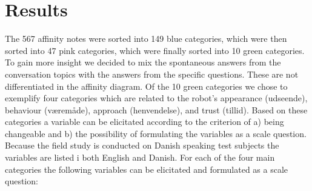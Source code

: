 \section{Results}
\label{Results}
%
The 567 affinity notes were sorted into 149 blue categories, which were then sorted into 47 pink categories, which were finally sorted into 10 green categories. To gain more insight we decided to mix the spontaneous answers from the conversation topics with the answers from the specific questions. These are not differentiated in the affinity diagram. Of the 10 green categories we chose to exemplify four categories which are related to the robot’s appearance (udseende), behaviour (væremåde), approach (henvendelse), and trust (tillid). Based on these categories a variable can be elicitated according to the criterion of a) being changeable and b) the possibility of formulating the variables as a scale question. Because the field study is conducted on Danish speaking test subjects the variables are listed i both English and Danish. For each of the four main categories the following variables can be elicitated and formulated as a scale question:\\
%
